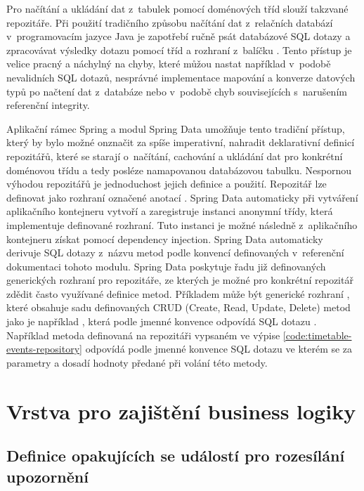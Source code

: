 Pro načítání a ukládání dat z~tabulek pomocí doménových tříd slouží takzvané repozitáře. Při použití tradičního způsobu načítání dat z~relačních databází v~programovacím jazyce Java je zapotřebí ručně psát databázové SQL dotazy a zpracovávat výsledky dotazu pomocí tříd a rozhraní z~balíčku . Tento přístup je velice pracný a náchylný na chyby, které můžou nastat například v~podobě nevalidních SQL dotazů, nesprávné implementace mapování a konverze datových typů po načtení dat z~databáze nebo v~podobě chyb souvisejících s~narušením referenční integrity. 

Aplikační rámec Spring a modul Spring Data umožňuje tento tradiční přístup, který by bylo možné onznačit za spíše imperativní, nahradit deklarativní definicí repozitářů, které se starají o~načítání, cachování a ukládání dat pro konkrétní doménovou třídu a tedy posléze namapovanou databázovou tabulku. Nespornou výhodou repozitářů je jednoduchost jejich definice a použití. Repozitář lze definovat jako rozhraní označené anotací . Spring Data automaticky při vytváření aplikačního kontejneru vytvoří a zaregistruje instanci anonymní třídy, která implementuje definované rozhraní. Tuto instanci je možné následně z~aplikačního kontejneru získat pomocí dependency injection. Spring Data automaticky derivuje SQL dotazy z~názvu metod podle konvencí definovaných v~referenční dokumentaci tohoto modulu. Spring Data poskytuje řadu již definovaných generických rozhraní pro repozitáře, ze kterých je možné pro konkrétní repozitář zdědit často využívané definice metod. Příkladem může být generické rozhraní , které obsahuje sadu definovaných CRUD (Create, Read, Update, Delete) metod jako je například , která podle jmenné konvence odpovídá SQL dotazu . Například metoda  definovaná na repozitáři  vypsaném ve výpise \ref{code:timetable-events-repository} odpovídá podle jmenné konvence SQL dotazu  ve kterém se za parametry  a  dosadí hodnoty předané při volání této metody.

\section{Vrstva pro zajištění business logiky}

\subsection{Definice opakujících se událostí pro rozesílání upozornění}

